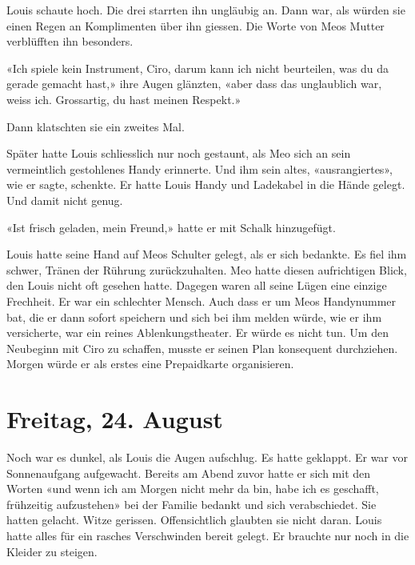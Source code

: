 Louis schaute hoch. Die drei starrten ihn ungläubig an. Dann war, als
würden sie einen Regen an Komplimenten über ihn giessen.
Die Worte von Meos Mutter verblüfften ihn besonders.

«Ich spiele kein Instrument, Ciro, darum kann ich nicht beurteilen,
was du da gerade gemacht hast,» ihre Augen glänzten, «aber dass das
unglaublich war, weiss ich. Grossartig, du hast meinen Respekt.»

Dann klatschten sie ein zweites Mal.

\sectionbreak

Später hatte Louis schliesslich nur noch gestaunt, als Meo sich an sein
vermeintlich gestohlenes Handy erinnerte. Und ihm sein altes,
«ausrangiertes», wie er sagte, schenkte. Er hatte Louis Handy und
Ladekabel in die Hände gelegt. Und damit nicht genug.

«Ist frisch geladen, mein Freund,» hatte er mit Schalk hinzugefügt.

Louis hatte seine Hand auf Meos Schulter gelegt, als er sich bedankte.
Es fiel ihm schwer, Tränen der Rührung zurückzuhalten. Meo hatte diesen
aufrichtigen Blick, den Louis nicht oft gesehen hatte.
Dagegen waren all seine Lügen eine einzige Frechheit. Er war ein
schlechter Mensch. Auch dass er um Meos Handynummer bat, die er dann
sofort speichern und sich bei ihm melden würde, wie er ihm versicherte,
war ein reines Ablenkungstheater. Er würde es nicht tun. Um den Neubeginn mit Ciro zu schaffen, musste 
er seinen Plan konsequent durchziehen. Morgen würde er als erstes eine Prepaidkarte organisieren. 

\sectionbreak

\section{Freitag, 24. August}


Noch war es dunkel, als Louis die Augen aufschlug. Es hatte geklappt. Er
war vor Sonnenaufgang aufgewacht. Bereits am Abend zuvor hatte er sich mit
den Worten «und wenn ich am Morgen nicht mehr da bin, habe ich es
geschafft, frühzeitig aufzustehen» bei der Familie bedankt und sich
verabschiedet. Sie hatten gelacht. Witze gerissen. Offensichtlich
glaubten sie nicht daran. Louis hatte alles für ein rasches Verschwinden bereit gelegt. Er
brauchte nur noch in die Kleider zu steigen.

